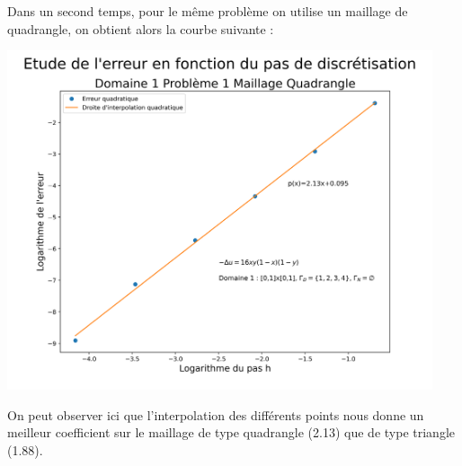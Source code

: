 \documentclass[a4paper, 12pt, french]{report}
\begin{document}
Dans un second temps, pour le même problème on utilise un maillage de quadrangle, on obtient alors la courbe suivante :
\begin{center}
    \includegraphics[height=10cm]{../Images/Courbes_Erreurs/D1P1Q.png}
\end{center}

On peut observer ici que l'interpolation des différents points nous donne un meilleur coefficient sur le maillage de type quadrangle (2.13) que de type triangle (1.88). 
\end{document}
